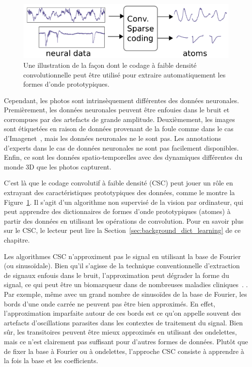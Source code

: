 \begin{figure}[t]
\begin{center}
   \includegraphics[width=0.85\linewidth]{figures/schema.pdf}
\end{center}
   \caption[]{Une illustration de la façon dont le codage à faible densité convolutionnelle peut être utilisé pour extraire automatiquement les formes d'onde prototypiques.}
   \label{fig:sommaire:csc_schematic}
\end{figure}

Cependant, les photos sont intrinsèquement différentes des données neuronales. Premièrement, les données neuronales peuvent être enfouies dans le bruit et corrompues par des artefacts de grande amplitude. Deuxièmement, les images sont étiquetées en raison de données provenant de la foule comme dans le cas d'Imagenet~\citep{deng2009imagenet}, mais les données neuronales ne le sont pas. Les annotations d'experts dans le cas de données neuronales ne sont pas facilement disponibles. Enfin, ce sont les données spatio-temporelles avec des dynamiques différentes du monde 3D que les photos capturent. 

C'est là que le codage convolutif à faible densité (CSC) peut jouer un rôle en extrayant des caractéristiques prototypiques des données, comme le montre la  Figure~\ref{fig:sommaire:csc_schematic}. Il s'agit d'un algorithme non supervisé de la vision par ordinateur, qui peut apprendre des dictionnaires de formes d'onde prototypiques (atomes) à partir des données en utilisant les opérations de convolution. Pour en savoir plus sur le CSC, le lecteur peut lire la Section~\ref{sec:background_dict_learning} de ce chapitre.

Les algorithmes CSC n'approximent pas le signal en utilisant la base de Fourier (ou sinusoïdale). Bien qu'il s'agisse de la technique conventionnelle d'extraction de signaux enfouis dans le bruit, l'approximation peut dégrader la forme du signal, ce qui peut être un biomarqueur dans de nombreuses maladies cliniques~\citep{cole2017brain}. . Par exemple, même avec un grand nombre de sinusoïdes de la base de Fourier, les bords d'une onde carrée ne peuvent pas être bien approximés. En effet, l'approximation imparfaite autour de ces bords est ce qu'on appelle souvent des artefacts d’oscillations parasites dans les contextes de traitement du signal. Bien sûr, les transitoires peuvent être mieux approximés en utilisant des ondelettes, mais ce n'est clairement pas suffisant pour d'autres formes de données. Plutôt que de fixer la base à Fourier ou à ondelettes, l'approche CSC consiste à apprendre à la fois la base et les coefficients.

